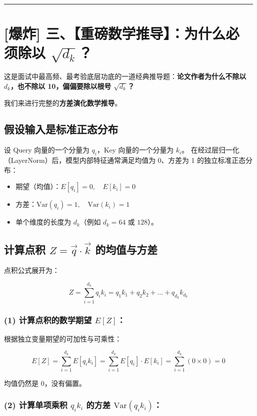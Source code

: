 \vspace{0.8em}\hrule\vspace{0.8em}

\section{[爆炸] 三、【重磅数学推导】：为什么必须除以 $\sqrt{d_k}$？}

这是面试中最高频、最考验底层功底的一道经典推导题：\textbf{论文作者为什么不除以 $d_k$，也不除以 10，偏偏要除以根号 $\sqrt{d_k}$？}

我们来进行完整的\textbf{方差演化数学推导}。

\subsection{假设输入是标准正态分布}

设 Query 向量的一个分量为 $q_i$，Key 向量的一个分量为 $k_i$。
在经过层归一化（LayerNorm）后，模型内部特征通常满足均值为 0、方差为 1 的独立标准正态分布：
\begin{itemize}
  \item 期望（均值）：$E[q_i] = 0, \quad E[k_i] = 0$
  \item 方差：$\text{Var}(q_i) = 1, \quad \text{Var}(k_i) = 1$
  \item 单个维度的长度为 $d_k$（例如 $d_k = 64$ 或 $128$）。
\end{itemize}

\subsection{计算点积 $Z = \vec{q} \cdot \vec{k}$ 的均值与方差}

点积公式展开为：

\[
Z = \sum_{i=1}^{d_k} q_i k_i = q_1 k_1 + q_2 k_2 + \dots + q_{d_k} k_{d_k}
\]

\subsubsection{(1) 计算点积的数学期望 $E[Z]$：}

根据独立变量期望的可加性与可乘性：

\[
E[Z] = \sum_{i=1}^{d_k} E[q_i k_i] = \sum_{i=1}^{d_k} E[q_i] \cdot E[k_i] = \sum_{i=1}^{d_k} (0 \times 0) = 0
\]

均值仍然是 0，没有偏置。

\subsubsection{(2) 计算单项乘积 $q_i k_i$ 的方差 $\text{Var}(q_i k_i)$：}

